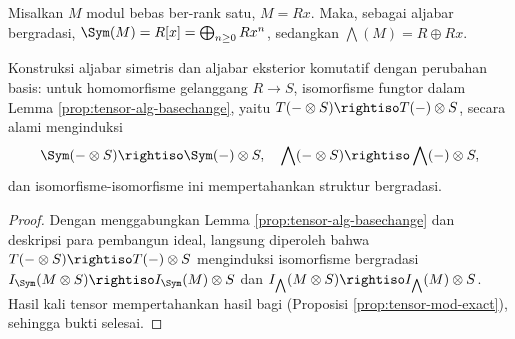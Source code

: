 \begin{example}\label{eg:Sym-wedge-rank1}
	Misalkan $M$ modul bebas ber-rank satu, $M = Rx$. Maka, sebagai aljabar bergradasi, $\Sym(M) = R[x] = \bigoplus_{n \geq 0} R x^n$, sedangkan $\bigwedge(M) = R \oplus Rx$.
\end{example}

\begin{lemma}
	Konstruksi aljabar simetris dan aljabar eksterior komutatif dengan perubahan basis: untuk homomorfisme gelanggang $R \to S$, isomorfisme fungtor dalam Lemma \ref{prop:tensor-alg-basechange}, yaitu $T(- \otimes S) \rightiso T(-) \otimes S$, secara alami menginduksi
	\[ \Sym(- \otimes S) \rightiso \Sym(-) \otimes S, \quad \bigwedge(- \otimes S) \rightiso \bigwedge(-) \otimes S, \]
	dan isomorfisme-isomorfisme ini mempertahankan struktur bergradasi.
\end{lemma}
\begin{proof}
	Dengan menggabungkan Lemma \ref{prop:tensor-alg-basechange} dan deskripsi para pembangun ideal, langsung diperoleh bahwa $T(- \otimes S) \rightiso T(-) \otimes S$ menginduksi isomorfisme bergradasi $I_{\Sym}(M \otimes S) \rightiso I_{\Sym}(M) \otimes S$ dan $I_{\bigwedge}(M \otimes S) \rightiso I_{\bigwedge}(M) \otimes S$. Hasil kali tensor mempertahankan hasil bagi (Proposisi \ref{prop:tensor-mod-exact}), sehingga bukti selesai.
\end{proof}

